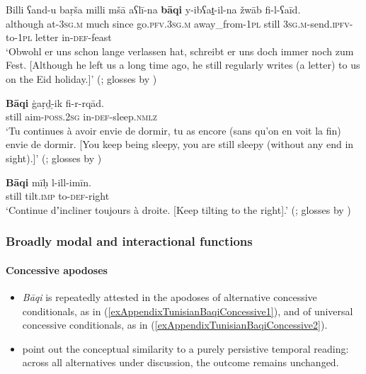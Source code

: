 \begin{exe}
	\ex 
	\gll Billi ʕand-u baṛša milli mšā aʕlī-na \textbf{bāqi} y-ibʕat̠-il-na žwāb fi-l-ʕaīd.\\
	although at-3\textsc{sg}.\textsc{m} much since go.\textsc{pfv}.3\textsc{sg}.\textsc{m} away\_from-1\textsc{pl} still 3\textsc{sg}.\textsc{m}-send.\textsc{ipfv}-to-1\textsc{pl} letter in-\textsc{def}-feast\\
	\glt \lq Obwohl er uns schon lange verlassen hat, schreibt er uns doch immer noch zum Fest. [Although he left us a long time ago, he still regularly writes (a letter) to us on the Eid holiday.]\rq{ }(\cite[703]{Singer1984}; glosses by \cite{FischerEtAlTunisian})

	\ex\label{exAppendixTunisianBaqi2}
	\gll \textbf{Bāqi} ġaṛḏ-̣ik fi-r-rqād.\\
	still aim-\textsc{poss}.2\textsc{sg} in-\textsc{def}-sleep.\textsc{nmlz}\\
	\glt \lq Tu continues à avoir envie de dormir, tu as encore (sans qu’on en voit la fin)
envie de dormir. [You keep being sleepy, you are still sleepy (without any end in sight).]\rq{ }(\cite[365]{MarcaisGuiga19581961}; glosses by \cite{FischerEtAlTunisian})

	\ex \label{exAppendixTunisianBaqi3}
	 \gll \textbf{Bāqi} mīḥ l-ill-imīn.\\
	still tilt.\textsc{imp} to-\textsc{def}-right\\
	\glt \lq Continue dʼincliner toujours à droite. [Keep tilting to the right].\rq{ }(\cite[365]{MarcaisGuiga19581961}; glosses by \cite{FischerEtAlTunisian})
\end{exe}

\subsubsection{Broadly modal and interactional functions}
\paragraph{Concessive apodoses}
\label{appendixtunisianBaqiConcessive}
\begin{itemize}
	\item \textit{Bāqi} is repeatedly attested in the apodoses of alternative concessive conditionals, as in (\ref{exAppendixTunisianBaqiConcessive1}), and of universal concessive conditionals, as in (\ref{exAppendixTunisianBaqiConcessive2}).
	\item \textcite{FischerEtAlTunisian} point out the conceptual similarity to a purely persistive temporal reading: across all alternatives under discussion, the outcome remains unchanged.
\end{itemize}

